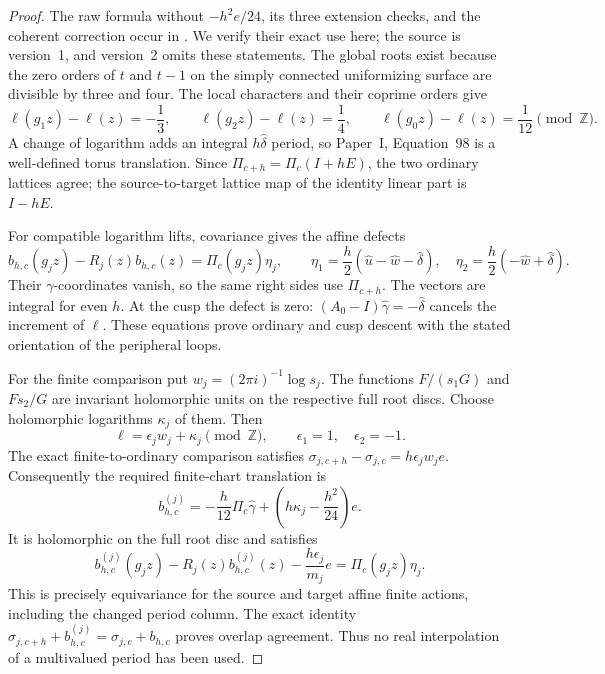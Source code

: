 \begin{proof}
The raw formula without \(-h^2e/24\), its three extension checks,
and the coherent correction occur in
\cite[\texttt{p2:prop:global-even-shift} and the subsequent
orbit-groupoid calculations]{DGKXv1push}. We verify their exact use
here; the source is version~1, and version~2 omits these statements.
The global roots exist because the zero orders of \(t\) and \(t-1\)
on the simply connected uniformizing surface are divisible by three
and four. The local characters and their coprime orders give
\[
 \ell(g_1z)-\ell(z)=-\frac13,\qquad
 \ell(g_2z)-\ell(z)=\frac14,\qquad
 \ell(g_0z)-\ell(z)=\frac1{12}\pmod{\mathbb Z}.
\]
A change of logarithm adds an integral \(h\widehat\delta\) period,
so Paper~I, Equation~98 is a well-defined torus translation.
Since \(\Pi_{c+h}=\Pi_c(I+hE)\), the two ordinary lattices agree;
the source-to-target lattice map of the identity linear part is
\(I-hE\).

For compatible logarithm lifts, covariance gives the affine defects
\[
 b_{h,c}(g_jz)-R_j(z)b_{h,c}(z)
       =\Pi_c(g_jz)\eta_j,\qquad
 \eta_1=\frac h2(\widehat u-\widehat w-\widehat\delta),\quad
 \eta_2=\frac h2(-\widehat w+\widehat\delta).
\]
Their \(\gamma\)-coordinates vanish, so the same right sides use
\(\Pi_{c+h}\). The vectors are integral for even \(h\). At the
cusp the defect is zero: \((A_0-I)\widehat\gamma=-\widehat\delta\)
cancels the increment of \(\ell\). These equations prove ordinary
and cusp descent with the stated orientation of the peripheral
loops.

For the finite comparison put \(w_j=(2\pi i)^{-1}\log s_j\).
The functions \(F/(s_1G)\) and \(Fs_2/G\) are invariant
holomorphic units on the respective full root discs. Choose
holomorphic logarithms \(\kappa_j\) of them. Then
\[
 \ell=\epsilon_jw_j+\kappa_j\pmod{\mathbb Z},\qquad
 \epsilon_1=1,\quad\epsilon_2=-1.
\]
The exact finite-to-ordinary comparison satisfies
\(\sigma_{j,c+h}-\sigma_{j,c}=h\epsilon_jw_je\).
Consequently the required finite-chart translation is
\[
 b^{(j)}_{h,c}
 =-\frac h{12}\Pi_c\widehat\gamma
       +\left(h\kappa_j-\frac{h^2}{24}\right)e.
\]
It is holomorphic on the full root disc and satisfies
\[
 b^{(j)}_{h,c}(g_jz)-R_j(z)b^{(j)}_{h,c}(z)
       -\frac{h\epsilon_j}{m_j}e
 =\Pi_c(g_jz)\eta_j.
\]
This is precisely equivariance for the source and target affine
finite actions, including the changed period column. The exact
identity
\(\sigma_{j,c+h}+b^{(j)}_{h,c}
=\sigma_{j,c}+b_{h,c}\) proves overlap agreement. Thus no real
interpolation of a multivalued period has been used.


\end{proof}
